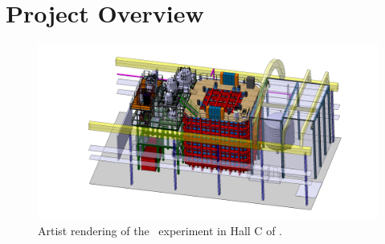 \section{Project Overview}
\label{sec:ProjectOverview}


\vspace{1cm}

\begin{figure}[t!]
\includegraphics[width=1.35\textwidth, angle=270]{./Figures/assembly_sequence_11_07/58.png}
\caption[Artist rendering of the \DSks\ experiment in Hall C of \LNGS]{Artist rendering of the \DSks\ experiment in Hall C of \LNGS.}
\label{fig:Overall-Design}
\end{figure}

